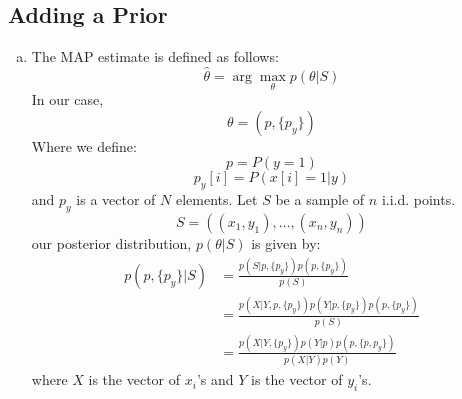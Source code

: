 \documentclass{amsart}
\theoremstyle{definition}
\begin{document}
\subsection{Adding a Prior}
\begin{enumerate}[(a)]
	\item 
		The MAP estimate is defined as follows:
		\[\hat{\theta} = \arg\max_\theta p(\theta |S)\]
		In our case, 
		\[\theta = (p, \{p_y\})\]
		Where we define:
		\[p = P(y = 1)\]
		\[p_y[i] = P(x[i] = 1|y)\]
		and $p_y$ is a vector of $N$ elements.
		Let $S$ be a sample of $n$ i.i.d. points.
		\[S = ((x_1, y_1), \ldots, (x_n, y_n))\]
		our posterior distribution, $p(\theta|S)$ is given by:
		\begin{align*}
			p(p, \{p_y\}|S) &= \frac{p(S|p, \{p_y\}) p(p, \{p_y\})}{p(S)}\\
			&= \frac{p(X|Y, p, \{p_y\}) p(Y|p, \{p_y\}) p(p, \{p_y\})}{p(S)}\\
			&= \frac{p(X|Y, \{p_y\})p(Y|p)p(p, \{p, p_y\})}{p(X|Y)p(Y)}
		\end{align*}
		where $X$ is the vector of $x_i$'s and $Y$ is the vector of $y_i$'s.


\end{enumerate}
\end{document}
